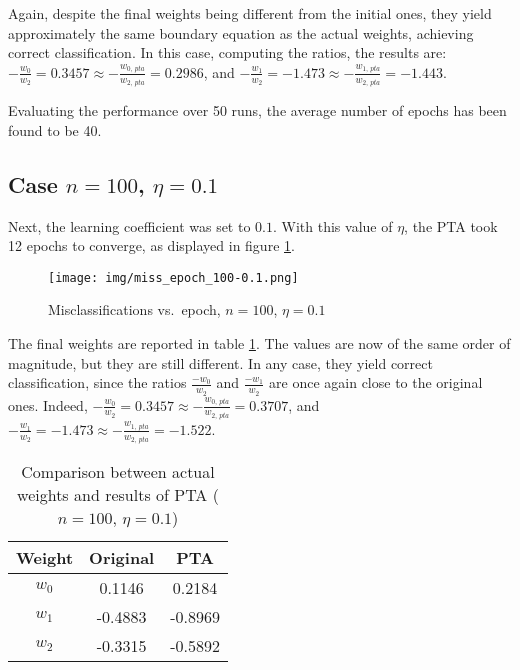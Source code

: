\documentclass[12pt]{article}
\begin{document}
Again, despite the final weights being different from the initial ones, they yield approximately the same boundary equation as the actual weights, achieving correct classification.
In this case, computing the ratios, the results are: $-\frac{w_0}{w_2} = 0.3457 \approx -\frac{w_{0,\, pta}}{w_{2,\, pta}} = 0.2986$, and $-\frac{w_1}{w_2} = -1.473 \approx -\frac{w_{1,\, pta}}{w_{2,\, pta}} = -1.443$.

Evaluating the performance over 50 runs, the average number of epochs has been found to be 40.

\subsection{Case $n=100$, $\eta=0.1$}
\label{sec:100-01}

Next, the learning coefficient was set to $0.1$.
With this value of $\eta$, the PTA took 12 epochs to converge, as displayed in figure \ref{fig:100-01-1}.

\begin{figure}[h]
    \centering
    \texttt{[image: img/miss\_epoch\_100-0.1.png]}
    \caption{Misclassifications vs.\ epoch, $n=100$, $\eta=0.1$}
    \label{fig:100-01-1}
\end{figure}

The final weights are reported in table \ref{tab:03}.
The values are now of the same order of magnitude, but they are still different.
In any case, they yield correct classification, since the ratios $\frac{-w_0}{w_2}$ and $\frac{-w_1}{w_2}$ are once again close to the original ones.
Indeed, $-\frac{w_0}{w_2} = 0.3457 \approx -\frac{w_{0,\, pta}}{w_{2,\, pta}} = 0.3707$, and $-\frac{w_1}{w_2} = -1.473 \approx -\frac{w_{1,\, pta}}{w_{2,\, pta}} = -1.522$.

\begin{table}[h]
    \centering
    \begin{tabular}{|c|c|c|}
        \hline
        Weight & \textbf{Original} & \textbf{PTA} \\ 
        \hline
        \hline
        $w_0$ & 0.1146 & 0.2184 \\
        \hline
        $w_1$ & -0.4883 & -0.8969 \\
        \hline
        $w_2$ & -0.3315 & -0.5892 \\
        \hline
    \end{tabular}
    \caption{Comparison between actual weights and results of PTA ($n=100$, $\eta=0.1$)}
    \label{tab:03}
\end{table}
\end{document}
